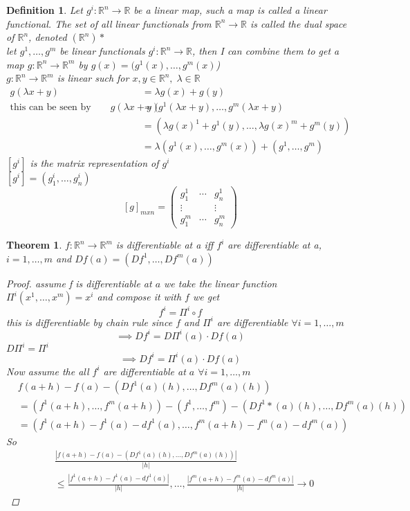 \documentclass[12pt]{article}
\def\RR{\mathbb{R}}
\newtheorem{theorem}{Theorem}[section]
\newtheorem{definition}{Definition}[section]
\begin{document}
\begin{definition}
Let $g^{i}:\RR^n \rightarrow \RR$ be a linear map, such a map is called a linear functional. The set of all linear functionals from $\RR^n \rightarrow \RR$ is called the dual space of $\RR^{n}$, denoted $(\RR^n)*$\\
let $g^{1}, \dots , g^{m}$ be linear functionals $g^{i}:\RR^n \rightarrow \RR$, then I can combine them to get a map $g:\RR^n \rightarrow \RR^{m}$ by $g(x) =(g^{1}(x), \dots , g^{m}(x)$)\\
$g:\RR^n \rightarrow \RR^{m}$ is linear such for $x,y \in \RR^n, \; \lambda \in \RR$
\begin{align*}
g(\lambda x +y) &= \lambda g(x) + g(y) \\
\text{this can be seen by} \qquad
g(\lambda x +y) &=(g^{1}( \lambda x + y), \dots , g^{m}( \lambda x + y) \\
&= ( \lambda g(x)^{1} +g^{1}(y), \dots ,\lambda g(x)^{m} +g^{m}(y))\\
&= \lambda (g^{1}(x), \dots, g^{m}(x)) + (g^{1}, \dots , g^{m})
\end{align*}
$[g^{i}]$ is the matrix representation of $g^{i}$\\
$[g^{i}] = (g_{1}^{i}, \dots , g_{n}^{i})$
\[ [g]_{mxn} = \begin{pmatrix}
  g_{1}^{1}  & \cdots & g_{n}^{1} \\
  \vdots   & & \vdots  \\
  g_{1}^{m} & \cdots &g_{n}^{m}
 \end{pmatrix}\]
\end{definition}

\begin{theorem}
$f:\RR^{n} \rightarrow \RR^{m}$ is differentiable at a iff $f^{i}$ are differentiable at a, $i=1, \dots , m$
and $Df(a) = (Df^{1}, \dots , Df^{m}(a))$
\begin{proof}
assume f is differentiable at $a$ we take the linear function $\Pi^{i}(x^{1}, \dots , x^{m}) = x^{i}$ and compose it with $f$ we get 
\[f^{i} =  \Pi^{i} \circ f\]
this is differentiable by chain rule since $f$ and $\Pi^{i}$ are differentiable $\forall i =1 , \dots , m$
\[ \implies Df^{i} = D\Pi^{i}(a) \cdot Df(a)\]
$D\Pi^{i} = \Pi^{i}$
\[ \implies Df^{i} = \Pi^{i}(a) \cdot Df(a) \]
Now assume the all $f^{i}$ are differentiable at $a$ $\forall i=1, \dots , m$
\begin{align*}
&f(a+h) - f(a) -(Df^{1}(a)(h), \dots , Df^{m}(a)(h))\\
 &= (f^{1}(a+h), \dots , f^{m}(a+h)) - (f^{1}, \dots, f^{m}) - (Df^{1}*(a)(h), \dots , Df^{m}(a)(h))\\
&=(f^{1}(a+h) -f^{1}(a) - df^{1}(a) , \dots , f^{m}(a+h) -f^{m}(a) - df^{m}(a))
\end{align*}
So
\begin{align*}
 &\frac{|f(a+h) - f(a) -(Df^{1}(a)(h), \dots , Df^{m}(a)(h))|}{|h|} \\
&\leq \frac{|f^{1}(a+h) -f^{1}(a) - df^{1}(a)|}{|h|} , \dots ,\frac{| f^{m}(a+h) -f^{m}(a) - df^{m}(a)|}{|h|} \rightarrow 0
\end{align*}
\end{proof}
\end{theorem} 
\end{document}
